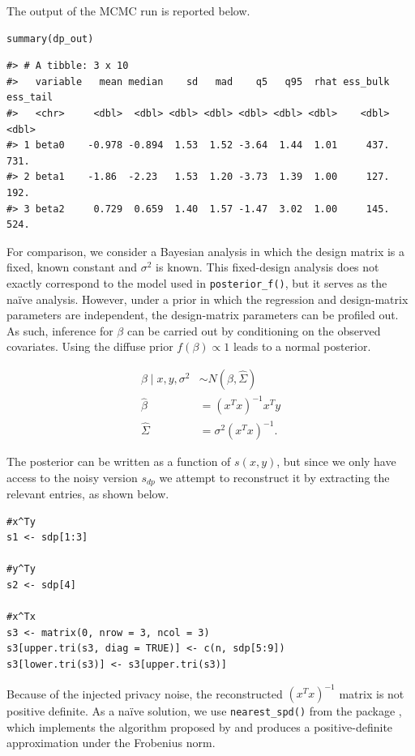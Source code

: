 The output of the MCMC run is reported below.

\begin{verbatim}
summary(dp_out)
\end{verbatim}

\begin{verbatim}
#> # A tibble: 3 x 10
#>   variable   mean median    sd   mad    q5   q95  rhat ess_bulk ess_tail
#>   <chr>     <dbl>  <dbl> <dbl> <dbl> <dbl> <dbl> <dbl>    <dbl>    <dbl>
#> 1 beta0    -0.978 -0.894  1.53  1.52 -3.64  1.44  1.01     437.     731.
#> 2 beta1    -1.86  -2.23   1.53  1.20 -3.73  1.39  1.00     127.     192.
#> 3 beta2     0.729  0.659  1.40  1.57 -1.47  3.02  1.00     145.     524.
\end{verbatim}

For comparison, we consider a Bayesian analysis in which the design matrix
is a fixed, known constant and \(\sigma^2\) is known. This fixed-design analysis
does not exactly correspond to the model used in \texttt{posterior\_f()}, but it serves
as the naïve analysis. However, under a prior in which the regression and
design-matrix parameters are independent, the design-matrix parameters can be
profiled out. As such, inference
for \(\beta\) can be carried out by conditioning on the observed covariates.
Using the diffuse prior \(f(\beta) \propto 1\) leads to a normal posterior.

\begin{equation*}
\begin{aligned}
\beta \mid x,y, \sigma^2 &\sim N(\hat{\beta}, \hat{\Sigma})\\
\hat{\beta} &= (x^Tx)^{-1}x^Ty\\
\hat{\Sigma} &= \sigma^{2}(x^Tx)^{-1}.
\end{aligned}
\end{equation*}

The posterior can be written as a function of \(s(x,y)\), but since
we only have access to the noisy version \(s_{dp}\) we
attempt to reconstruct it by extracting the
relevant entries, as shown below.

\begin{verbatim}
#x^Ty
s1 <- sdp[1:3]

#y^Ty
s2 <- sdp[4]

#x^Tx
s3 <- matrix(0, nrow = 3, ncol = 3)
s3[upper.tri(s3, diag = TRUE)] <- c(n, sdp[5:9])
s3[lower.tri(s3)] <- s3[upper.tri(s3)]
\end{verbatim}

Because of the injected privacy noise, the reconstructed
\((x^Tx)^{-1}\) matrix is not positive definite. As a naïve solution, we use
\texttt{nearest\_spd()} from the  package \citep{pracma_pkg}, which implements
the algorithm proposed by \citet{Higham1988} and produces a positive-definite
approximation under the Frobenius norm.

